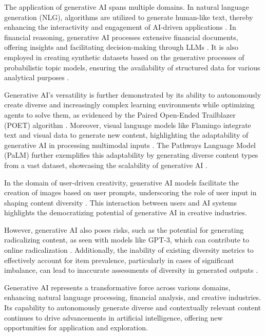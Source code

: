 The application of generative AI spans multiple domains. In natural language generation (NLG), algorithms are utilized to generate human-like text, thereby enhancing the interactivity and engagement of AI-driven applications \cite{tang2023mvpmultitasksupervisedpretraining}. In financial reasoning, generative AI processes extensive financial documents, offering insights and facilitating decision-making through LLMs \cite{reddy2024docfinqalongcontextfinancialreasoning}. It is also employed in creating synthetic datasets based on the generative processes of probabilistic topic models, ensuring the availability of structured data for various analytical purposes \cite{shi2019newevaluationframeworktopic}.



Generative AI's versatility is further demonstrated by its ability to autonomously create diverse and increasingly complex learning environments while optimizing agents to solve them, as evidenced by the Paired Open-Ended Trailblazer (POET) algorithm \cite{wang2019pairedopenendedtrailblazerpoet}. Moreover, visual language models like Flamingo integrate text and visual data to generate new content, highlighting the adaptability of generative AI in processing multimodal inputs \cite{alayrac2022flamingo}. The Pathways Language Model (PaLM) further exemplifies this adaptability by generating diverse content types from a vast dataset, showcasing the scalability of generative AI \cite{chowdhery2023palm}.



In the domain of user-driven creativity, generative AI models facilitate the creation of images based on user prompts, underscoring the role of user input in shaping content diversity \cite{palmini2024patternscreativityuserinput}. This interaction between users and AI systems highlights the democratizing potential of generative AI in creative industries.



However, generative AI also poses risks, such as the potential for generating radicalizing content, as seen with models like GPT-3, which can contribute to online radicalization \cite{mcguffie2020radicalizationrisksgpt3advanced}. Additionally, the inability of existing diversity metrics to effectively account for item prevalence, particularly in cases of significant imbalance, can lead to inaccurate assessments of diversity in generated outputs \cite{pasarkar2024cousinsvendiscorefamily}.



Generative AI represents a transformative force across various domains, enhancing natural language processing, financial analysis, and creative industries. Its capability to autonomously generate diverse and contextually relevant content continues to drive advancements in artificial intelligence, offering new opportunities for application and exploration.




